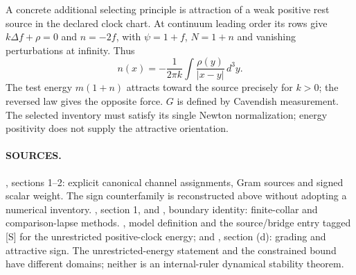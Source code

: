 A concrete additional selecting principle is attraction of a weak
positive rest source in the declared clock chart.
At continuum leading order its rows give
$k\Delta f+\rho=0$ and $n=-2f$, with
$\psi=1+f$, $N=1+n$ and vanishing perturbations at infinity.
Thus
\[
 n(x)=-\frac1{2\pi k}\int
       \frac{\rho(y)}{|x-y|}\,d^3y .
\]
The test energy $m(1+n)$ attracts toward the source precisely for
$k>0$; the reversed law gives the opposite force.
$G$ is defined by Cavendish measurement.
The selected inventory must satisfy its single Newton normalization;
energy positivity does not supply the attractive orientation.

\paragraph*{SOURCES.}
\begingroup\footnotesize
{},
sections 1--2: explicit canonical channel assignments, Gram sources
and signed scalar weight.  The sign counterfamily is reconstructed
above without adopting a numerical inventory.
,
section 1, and
,
boundary identity: finite-collar and comparison-lapse methods.
,
model definition and the source/bridge entry tagged [S] for the
unrestricted positive-clock energy; and
,
section (d): grading and attractive sign.
The unrestricted-energy statement and the constrained bound have
different domains; neither is an internal-ruler dynamical stability
theorem.
\endgroup
